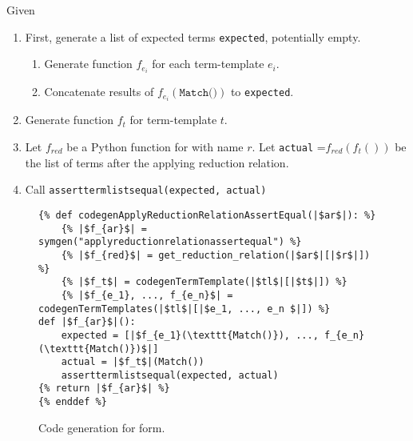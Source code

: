 Given \ApplyReductionRelationAssertEqual
\begin{enumerate}
\item First, generate a list of expected terms \texttt{expected}, potentially empty.
	\begin{enumerate}
	\item Generate function $f_{e_i}$ for each term-template $e_i$.
	\item Concatenate results of $f_{e_i}(\texttt{Match()})$ to \texttt{expected}.
	\end{enumerate}
\item Generate function $f_t$ for term-template $t$.
\item Let $f_{red}$ be a Python function for \RedexMatchAssertEqualNoArgs \space with name $r$. Let \texttt{actual} =$f_{red}(f_t())$ be the list of terms after the applying reduction relation.
\item Call \texttt{asserttermlistsequal(expected, actual)}
\end{enumerate}



\begin{figure}[ht]
\begin{verbatim}
{% def codegenApplyReductionRelationAssertEqual(|$ar$|): %}
	{% |$f_{ar}$| = symgen("applyreductionrelationassertequal") %}
	{% |$f_{red}$| = get_reduction_relation(|$ar$|[|$r$|]) %}
	{% |$f_t$| = codegenTermTemplate(|$tl$|[|$t$|]) %}
	{% |$f_{e_1}, ..., f_{e_n}$| = codegenTermTemplates(|$tl$|[|$e_1, ..., e_n $|]) %}
def |$f_{ar}$|():
	expected = [|$f_{e_1}(\texttt{Match()}), ..., f_{e_n}(\texttt{Match()})$|]
	actual = |$f_t$|(Match())
	asserttermlistsequal(expected, actual)
{% return |$f_{ar}$| %}
{% enddef %}
\end{verbatim}
\caption{Code generation for \ApplyReductionRelationAssertEqualNoArgs \space form.}
\label{codegen-applyred}
\end{figure}
